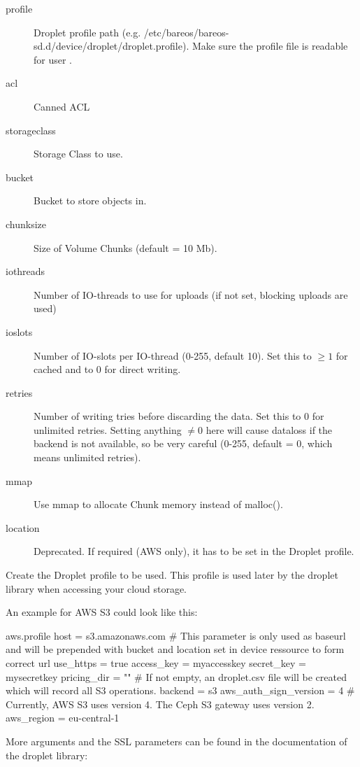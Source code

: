 \begin{description}
\item[profile] Droplet profile path (e.g. /etc/bareos/bareos-sd.d/device/droplet/droplet.profile). Make sure the profile file is readable for user .
\item[acl] Canned ACL
\item[storageclass] Storage Class to use.
\item[bucket] Bucket to store objects in.
\item[chunksize] Size of Volume Chunks (default = 10 Mb).
\item[iothreads] Number of IO-threads to use for uploads (if not set, blocking uploads are used)
\item[ioslots] Number of IO-slots per IO-thread (0-255, default 10). Set this to $\ge 1$ for cached and to 0 for direct writing.
\item[retries] Number of writing tries before discarding the data. Set this to 0 for unlimited retries. Setting anything $\neq 0$ here will cause dataloss if the backend is not available, so be very careful (0-255, default = 0, which means unlimited retries).
\item[mmap] Use mmap to allocate Chunk memory instead of malloc().
\item[location] Deprecated. If required (AWS only), it has to be set in the Droplet profile.
\end{description}


Create the Droplet profile to be used.
This profile is used later by the droplet library when accessing your cloud storage.

An example for AWS S3 could look like this:

\begin{config}{aws.profile}
host = s3.amazonaws.com         # This parameter is only used as baseurl and will be prepended with bucket and location set in device ressource to form correct url
use_https = true
access_key = myaccesskey
secret_key = mysecretkey
pricing_dir = ""                # If not empty, an droplet.csv file will be created which will record all S3 operations.
backend = s3
aws_auth_sign_version = 4       # Currently, AWS S3 uses version 4. The Ceph S3 gateway uses version 2.
aws_region = eu-central-1
\end{config}


More arguments and the SSL parameters can be found in the documentation of the droplet library:
\externalReferenceDropletDocConfigurationFile


